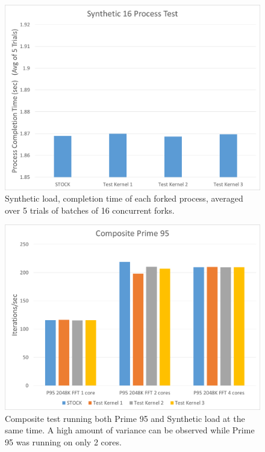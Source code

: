 \begin{figure}[hb]
	\includegraphics[width=1.0\columnwidth]{images/Synthetic}
	\caption{Synthetic load, completion time of each forked process, averaged over 5 trials of batches of 16 concurrent forks.}
\end{figure}

\begin{figure}[hb]
	\includegraphics[width=1.0\columnwidth]{images/CompositeP95}
	\caption{Composite test running both Prime 95 and Synthetic load at the same time. A high amount of variance can be observed while Prime 95 was running on only 2 cores.}
\end{figure}

